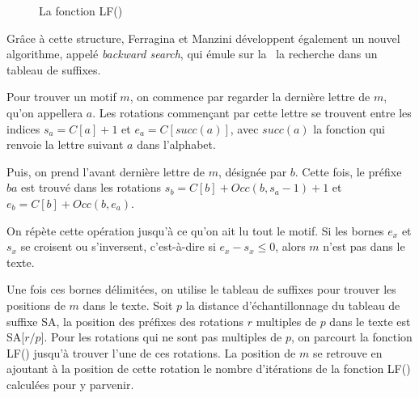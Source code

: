 \begin{figure}[h!]
\caption{La fonction LF()}
\label{lf} 
\end{figure}

Grâce à cette structure, Ferragina et Manzini développent également un nouvel algorithme, appelé \textit{backward search}, qui émule sur la \bwt\ la recherche dans un tableau de suffixes.

Pour trouver un motif $m$, on commence par regarder la dernière lettre de $m$, qu'on appellera $a$. Les rotations commençant par cette lettre se trouvent entre les indices $s_a = C[a] + 1$ et $e_a = C[succ(a)]$, avec $succ(a)$ la fonction qui renvoie la lettre suivant $a$ dans l'alphabet. 

Puis, on prend l'avant dernière lettre de $m$, désignée par $b$. Cette fois, le préfixe $ba$ est trouvé dans les rotations $s_b = C[b] + Occ(b, s_a-1) + 1$ et $e_b = C[b] + Occ(b, e_a)$.

On répète cette opération jusqu'à ce qu'on ait lu tout le motif. Si les bornes $e_x$ et $s_x$ se croisent ou s'inversent, c'est-à-dire si $e_x - s_x \le 0$, alors $m$ n'est pas dans le texte.

Une fois ces bornes délimitées, on utilise le tableau de suffixes pour trouver les positions de $m$ dans le texte. Soit $p$ la distance d'échantillonnage du tableau de suffixe SA, la position des préfixes des rotations $r$ multiples de $p$ dans le texte est SA[$r/p$]. Pour les rotations qui ne sont pas multiples de $p$, on parcourt la fonction LF() jusqu'à trouver l'une de ces rotations. La position de $m$ se retrouve en ajoutant à la position de cette rotation le nombre d'itérations de la fonction LF() calculées pour y parvenir.

